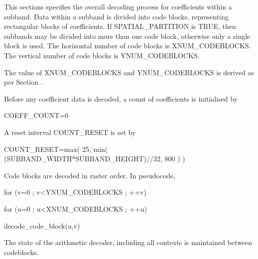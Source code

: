 This sections specifies the overall decoding process for coefficients
within a subband. Data within a subband is divided into code blocks,
representing rectangular blocks of coefficients. If SPATIAL\_PARTITION is
TRUE, then subbands may be divided into more than one code block,
otherwise only a single block is used. The horizontal number of code
blocks is XNUM\_CODEBLOCKS. The vertical number of code blocks is
YNUM\_CODEBLOCKS. 

The value of XNUM\_CODEBLOCKS and YNUM\_CODEBLOCKS is derived as per
Section . 

Before any coefficient data is decoded, a count of coefficients is
initialised by

COEFF\_COUNT=0

A reset interval COUNT\_RESET is set by 

COUNT\_RESET=max( 25, min( (SUBBAND\_WIDTH*SUBBAND\_HEIGHT)//32, 800 ) )

Code blocks are decoded in raster order. In pseudocode,

for (v=0 ; v<YNUM\_CODEBLOCKS ; ++v)

{

    for (u=0 ; u<XNUM\_CODEBLOCKS ; ++u)

        decode\_code\_block(u,v)

}

The state of the arithmetic decoder, including all contexts is
maintained between codeblocks.



